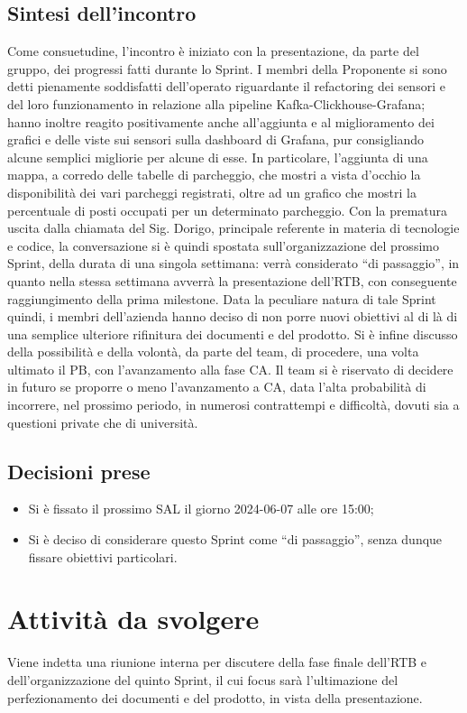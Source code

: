 \documentclass[8pt]{article}
\newcommand{\signatureline}[1]{%
	 \par\vspace{0.5cm}
	\noindent\makebox[\linewidth][r]{\rule{0.2\textwidth}{0.5pt}\hspace{3cm}\makebox[0pt][r]{\vspace{3pt}\footnotesize #1}}%
}
\begin{document}
\subsection{Sintesi dell'incontro}
Come consuetudine, l'incontro è iniziato con la presentazione, da parte del gruppo, dei progressi fatti durante lo Sprint. I membri della
Proponente si sono detti pienamente soddisfatti dell'operato riguardante il refactoring dei sensori e del loro funzionamento in relazione
alla pipeline Kafka-Clickhouse-Grafana; hanno inoltre reagito positivamente anche all'aggiunta e al miglioramento dei grafici e delle viste
sui sensori sulla dashboard di Grafana, pur consigliando alcune semplici migliorie per alcune di esse. In particolare, l'aggiunta di una
mappa, a corredo delle tabelle di parcheggio, che mostri a vista d'occhio la disponibilità dei vari parcheggi registrati, oltre ad un
grafico che mostri la percentuale di posti occupati per un determinato parcheggio. Con la prematura uscita dalla chiamata del Sig. Dorigo,
principale referente in materia di tecnologie e codice, la conversazione si è quindi spostata sull'organizzazione del prossimo Sprint, della
durata di una singola settimana: verrà considerato ``di passaggio'', in quanto nella stessa settimana avverrà la presentazione dell'RTB, con conseguente
raggiungimento della prima milestone. Data la peculiare natura di tale Sprint quindi, i membri dell'azienda hanno deciso di non porre nuovi obiettivi
al di là di una semplice ulteriore rifinitura dei documenti e del prodotto. Si è infine discusso della possibilità e della volontà, da parte del 
team, di procedere, una volta ultimato il PB, con l'avanzamento alla fase CA. Il team si è riservato di decidere in futuro se proporre o meno 
l'avanzamento a CA, data l'alta probabilità di incorrere, nel prossimo periodo, in numerosi contrattempi e difficoltà, dovuti sia a questioni 
private che di università. 

\subsection{Decisioni prese}
\begin{itemize}
	\setlength\itemsep{0em}
	\item Si è fissato il prossimo SAL il giorno 2024-06-07 alle ore 15:00;
	\item Si è deciso di considerare questo Sprint come ``di passaggio'', senza dunque fissare obiettivi particolari.
\end{itemize}
\newpage
\section{Attività da svolgere}
Viene indetta una riunione interna per discutere della fase finale dell'RTB e dell'organizzazione del quinto Sprint, il cui focus
sarà l'ultimazione del perfezionamento dei documenti e del prodotto, in vista della presentazione. 
\signatureline{Padova, 2024-06-04}
\end{document}
